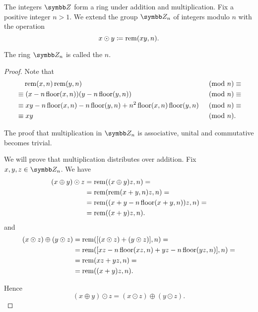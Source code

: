 \begin{definition}\label{def:ring_of_integers_modulo}
  The integers \( \Z \) form a ring under addition and multiplication. Fix a positive integer \( n > 1 \). We extend the group \( \Z_n \) of integers modulo \( n \) with the operation
  \begin{equation*}
    x \odot y \coloneqq \operatorname{rem}(xy, n).
  \end{equation*}

  The ring \( \Z_n \) is called the  \( n \).
\end{definition}
\begin{proof}
  Note that
  \begin{align*}
    &\phantom{\equiv}\; \operatorname{rem}(x, n) \operatorname{rem}(y, n)
    &\pmod n \equiv \\ &\equiv
    (x - n \operatorname{floor}(x, n)) (y - n \operatorname{floor}(y, n))
    &\pmod n \equiv \\ &\equiv
    xy - n \operatorname{floor}(x, n) - n \operatorname{floor}(y, n) + n^2 \operatorname{floor}(x, n) \operatorname{floor}(y, n)
    &\pmod n \equiv \\ &\equiv
    xy
    &\pmod n. \phantom{\equiv}
  \end{align*}

  The proof that multiplication in \( \Z_n \) is associative, unital and commutative becomes trivial.

  We will prove that multiplication distributes over addition. Fix \( x, y, z \in \Z_n \). We have
  \begin{align*}
    (x \oplus y) \odot z
    &=
    \operatorname{rem}((x \oplus y) z, n)
    = \\ &=
    \operatorname{rem}(\operatorname{rem}(x + y, n) z, n)
    = \\ &=
    \operatorname{rem}((x + y - n \operatorname{floor}(x + y, n)) z, n)
    = \\ &=
    \operatorname{rem}((x + y)z, n).
  \end{align*}
  and
  \begin{align*}
    (x \odot z) \oplus (y \odot z)
    &=
    \operatorname{rem}([(x \odot z) + (y \odot z)], n)
    = \\ &=
    \operatorname{rem}([xz - n \operatorname{floor}(xz, n) + yz - n \operatorname{floor}(yz, n)], n)
    = \\ &=
    \operatorname{rem}(xz + yz, n)
    = \\ &=
    \operatorname{rem}((x + y)z, n).
  \end{align*}

  Hence
  \begin{equation*}
    (x \oplus y) \odot z = (x \odot z) \oplus (y \odot z).
  \end{equation*}
\end{proof}

